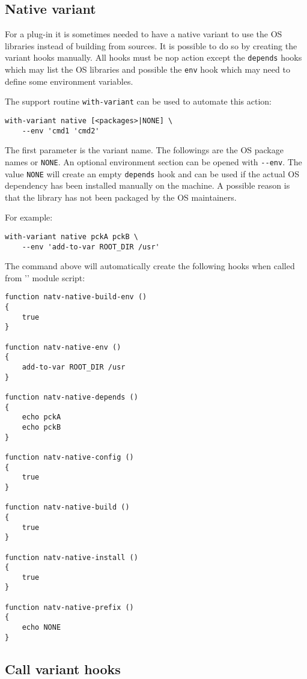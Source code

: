 \documentclass[a4paper,12pt,twoside]{article}
\newcommand{\code}[1]{\texttt{#1}}
\newcommand{\file}[1]{'{\path{#1}}'}
\newcommand{\ddash}{-{}-}
\begin{document}
\subsection{Native variant}
\label{native variant}

For a plug-in it is sometimes needed to have a native variant to use the OS libraries instead of building from sources. It is possible to do so by creating the variant hooks manually. All hooks must be nop action except the \code{depends} hooks which may list the OS libraries and possible the \code{env} hook which may need to define some environment variables.

The support routine \code{with-variant} can be used to automate this action:

\begin{lstlisting}
with-variant native [<packages>|NONE] \
	--env 'cmd1 'cmd2'
\end{lstlisting}

The first parameter is the variant name. The followings are the OS package names or \code{NONE}. An optional environment section can be opened with \code{\ddash{}env}. The value \code{NONE} will create an empty \code{depends} hook and can be used if the actual OS dependency has been installed manually on the machine. A possible reason is that the library has not been packaged by the OS maintainers.

For example:

\begin{lstlisting}
with-variant native pckA pckB \
	--env 'add-to-var ROOT_DIR /usr'
\end{lstlisting}

The command above will automatically create the following hooks when called from \file{natv} module script:

\begin{lstlisting}
function natv-native-build-env ()
{
	true
}

function natv-native-env ()
{
	add-to-var ROOT_DIR /usr
}

function natv-native-depends ()
{
	echo pckA
	echo pckB
}

function natv-native-config ()
{
	true
}

function natv-native-build ()
{
	true
}

function natv-native-install ()
{
	true
}

function natv-native-prefix ()
{
	echo NONE
}
\end{lstlisting}

\subsection{Call variant hooks}
\label{call variant hooks}
\end{document}
